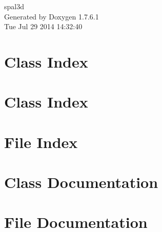 \documentclass[a4paper]{book}
\begin{document}
\hypersetup{pageanchor=false,citecolor=blue}
\begin{titlepage}
\vspace*{7cm}
\begin{center}
{\Large spal3d }\\
\vspace*{1cm}
{\large \-Generated by Doxygen 1.7.6.1}\\
\vspace*{0.5cm}
{\small Tue Jul 29 2014 14:32:40}\\
\end{center}
\end{titlepage}
\clearemptydoublepage
{}
\tableofcontents
\clearemptydoublepage
{}
\hypersetup{pageanchor=true,citecolor=blue}
\chapter{\-Class \-Index}

\chapter{\-Class \-Index}

\chapter{\-File \-Index}

\chapter{\-Class \-Documentation}















\chapter{\-File \-Documentation}













\printindex
\end{document}
